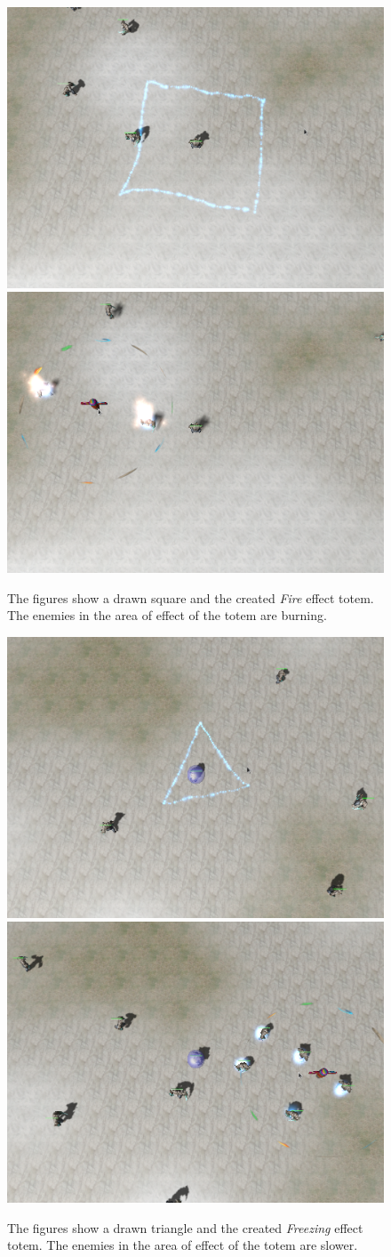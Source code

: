 \begin{figure}[p]
\centering
\includegraphics[width=.47\linewidth]{ext/scr/square.png}
\quad
\includegraphics[width=.47\linewidth]{ext/scr/squaree.png}
\caption{The figures show a drawn square and the created \emph{Fire} effect totem. The enemies in the area of effect of the totem are burning. }
\label{fig:spell:square}
\end{figure}

\begin{figure}[p]
\centering
\includegraphics[width=.47\linewidth]{ext/scr/triangle.png}
\quad
\includegraphics[width=.47\linewidth]{ext/scr/trianglee.png}
\caption{The figures show a drawn triangle and the created \emph{Freezing} effect totem. The enemies in the area of effect of the totem are slower.}
\label{fig:spell:triangle}
\end{figure}


